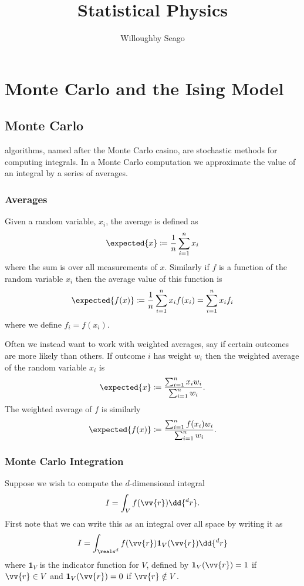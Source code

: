 \documentclass[fleqn]{NotesClass}
\title{Statistical Physics}
\author{Willoughby Seago}
\date{}
\newcommand*{\indicator}{\mathbf{1}}
\begin{document}
    \frontmatter
    \titlepage
    \tableofcontents
    \mainmatter
    
    \part{Monte Carlo and the Ising Model}
    \chapter{Monte Carlo}
     algorithms, named after the Monte Carlo casino, are stochastic methods for computing integrals.
    In a Monte Carlo computation we approximate the value of an integral by a series of averages.
    
    \section{Averages}
    Given a random variable, \(x_i\), the average is defined as
    \begin{equation}
        \expected{x} \coloneqq \frac{1}{n} \sum_{i=1}^{n} x_i
    \end{equation}
    where the sum is over all measurements of \(x\).
    Similarly if \(f\) is a function of the random variable \(x_i\) then the average value of this function is
    \begin{equation}
        \expected{f(x)} \coloneqq \frac{1}{n} \sum_{i=1}^{n} x_if(x_i) = \sum_{i=1}^{n} x_if_i
    \end{equation}
    where we define \(f_i = f(x_i)\).
    
    Often we instead want to work with weighted averages, say if certain outcomes are more likely than others.
    If outcome \(i\) has weight \(w_i\) then the weighted average of the random variable \(x_i\) is
    \begin{equation}
        \expected{x} \coloneqq \frac{\sum_{i=1}^{n} x_iw_i}{\sum_{i=1}^{n} w_i}.
    \end{equation}
    The weighted average of \(f\) is similarly
    \begin{equation}
        \expected{f(x)} \coloneqq \frac{\sum_{i=1}^{n} f(x_i)w_i}{\sum_{i=1}^{n}w_i}.
    \end{equation}
    
    \section{Monte Carlo Integration}
    Suppose we wish to compute the \(d\)-dimensional integral
    \begin{equation}
        I = \int_V f(\vv{r}) \dd{^dr}.
    \end{equation}
    First note that we can write this as an integral over all space by writing it as
    \begin{equation}
        I = \int_{\reals^d} f(\vv{r}) \indicator_V(\vv{r}) \dd{^dr}
    \end{equation}
    where \(\indicator_V\) is the indicator function for \(V\), defined by \(\indicator_V(\vv{r}) = 1\) if \(\vv{r} \in V\) and \(\indicator_V(\vv{r}) = 0\) if \(\vv{r} \notin V\).
    
\end{document}
